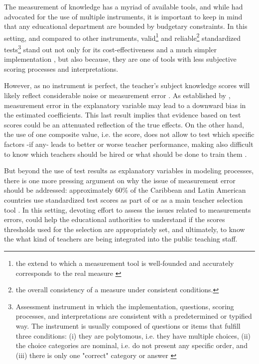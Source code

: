 The measurement of knowledge has a myriad of available tools, and while \citet{Bertoni_et_al_2020b} had advocated for the use of multiple instruments, it is important to keep in mind that any educational department are bounded by budgetary constraints. In this setting, and compared to other instruments, valid\footnote{the extend to which a measurement tool is well-founded and accurately corresponds to the real measure \citep{Kelley_1927}} and reliable\footnote{the overall consistency of a measure under consistent conditions.} standardized tests\footnote{Assessment instrument in which the implementation, questions, scoring processes, and interpretations are consistent with a predetermined or typified way. The instrument is usually composed of questions or items that fulfill three conditions: (i) they are polytomous, i.e. they have multiple choices, (ii) the choice categories are nominal, i.e. do not present any specific order, and (iii) there is only one "correct" category or answer \citep{Rivera_2019}} stand out not only for its cost-effectiveness and a much simpler implementation \citep{Hincapie_et_al_2020}, but also because, they are one of tools with less subjective scoring processes and interpretations.

However, as no instrument is perfect, the teacher's subject knowledge scores will likely reflect considerable noise or measurement error \citep{Metzler_et_al_2012}. As established by \citet{Angrist_et_al_1999}, measurement error in the explanatory variable may lead to a downward bias in the estimated coefficients. This last result implies that evidence based on test scores could be an attenuated reflection of the true effects. On the other hand, the use of one composite value, i.e. the score, does not allow to test which specific factors -if any- leads to better or worse teacher performance, making also difficult to know which teachers should be hired or what should be done to train them \citep{Hanushek_et_al_2012}.

But beyond the use of test results as explanatory variables in modeling processes, there is one more pressing argument on why the issue of measurement error should be addressed: approximately 60\% of the Caribbean and Latin American countries use standardized test scores as part of or as a main teacher selection tool \citep{Hincapie_et_al_2020}. In this setting, devoting effort to assess the issues related to measurements errors, could help the educational authorities to understand if the scores thresholds used for the selection are appropriately set, and ultimately, to know the what kind of teachers are being integrated into the public teaching staff.

